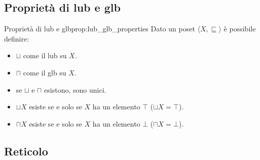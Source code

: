 \subsection{Proprietà di lub e glb}
\begin{proposizione}{Proprietà di lub e glb}{prop:lub_glb_properties}
Dato un poset $\langle X, \sqsubseteq \rangle$ è possibile definire:
\begin{itemize}
    \item $\sqcup $ come il lub su $X$.
    \item $\sqcap $ come il glb su $X$.
    \item se $\sqcup $ e $\sqcap $ esistono, sono unici.
    \item $\sqcup X$ esiste se e solo se $X$ ha un elemento $\top$ ($\sqcup X = \top$).
    \item $\sqcap X$ esiste se e solo se $X$ ha un elemento $\bot$ ($\sqcap X = \bot$).
\end{itemize}
\end{proposizione}
\subsection{Reticolo}

